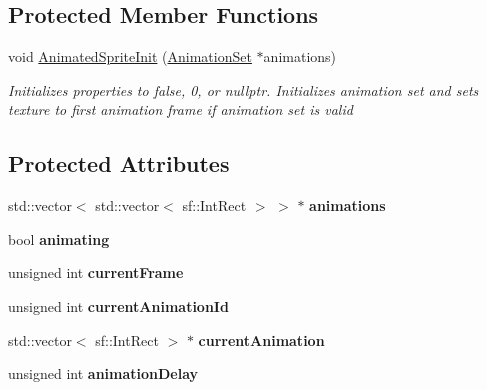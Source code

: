 \subsection*{Protected Member Functions}
\begin{DoxyCompactItemize}
\item 
void \hyperlink{class_animated_sprite_a003d5c113b53ad5cb6c9836fb7b6d7c0}{Animated\+Sprite\+Init} (\hyperlink{class_animation_set}{Animation\+Set} $\ast$animations)
\begin{DoxyCompactList}\small\item\em Initializes properties to false, 0, or nullptr. Initializes animation set and sets texture to first animation frame if animation set is valid \end{DoxyCompactList}\end{DoxyCompactItemize}
\subsection*{Protected Attributes}
\begin{DoxyCompactItemize}
\item 
\mbox{\label{class_animated_sprite_ae7c4fff66a7faf50d34e2864c0e21412}} 
std\+::vector$<$ std\+::vector$<$ sf\+::\+Int\+Rect $>$ $>$ $\ast$ {\bfseries animations}
\item 
\mbox{\label{class_animated_sprite_a9f402cf567f00b4e9778cd078b1111d0}} 
bool {\bfseries animating}
\item 
\mbox{\label{class_animated_sprite_a5f59f0b90be8597ecc9f4b114dfbcf01}} 
unsigned int {\bfseries current\+Frame}
\item 
\mbox{\label{class_animated_sprite_a9b346d42d71e889a20b9bcd32fab8470}} 
unsigned int {\bfseries current\+Animation\+Id}
\item 
\mbox{\label{class_animated_sprite_a1789989f7faf07dda742884b2251c256}} 
std\+::vector$<$ sf\+::\+Int\+Rect $>$ $\ast$ {\bfseries current\+Animation}
\item 
\mbox{\label{class_animated_sprite_a22ca1db04b4b746ee1363b57304dcb2b}} 
unsigned int {\bfseries animation\+Delay}
\end{DoxyCompactItemize}


